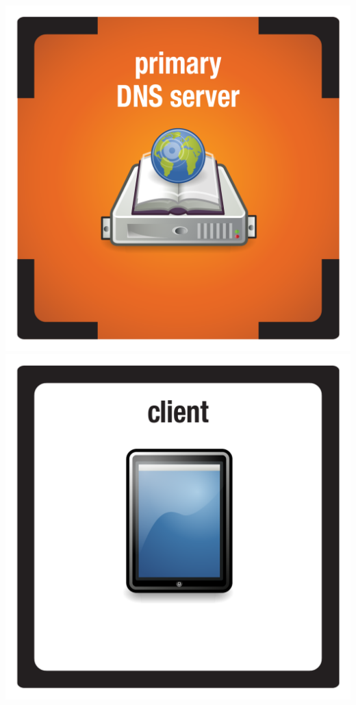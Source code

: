 \documentclass{letter}
\begin{document}
\includegraphics{tiles/node_primary_dns_compromised}
\includegraphics{tiles/node_client_tablet} \\
\end{document}

